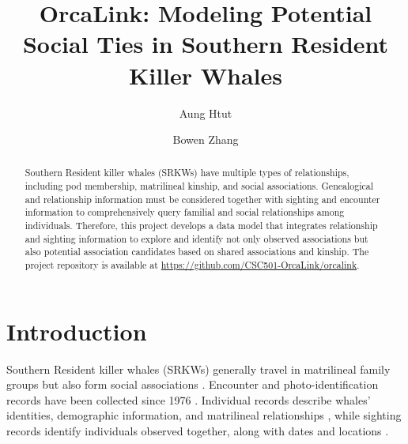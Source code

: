 \documentclass[sigconf]{acmart}
\begin{document}
\pagestyle{empty}
\title{\textbf{OrcaLink: Modeling Potential Social Ties in Southern Resident Killer Whales}}


\author{Aung Htut}
\author{Bowen Zhang}

\begin{abstract}
  Southern Resident killer whales (SRKWs) have multiple types of relationships, including pod membership, matrilineal kinship, and social associations.
Genealogical and relationship information must be considered together with sighting and encounter information to comprehensively query familial and social relationships among individuals.
Therefore, this project develops a data model that integrates relationship and sighting information to explore and identify not only observed associations but also potential association candidates based on shared associations and kinship. The project repository is available at
\url{https://github.com/CSC501-OrcaLink/orcalink}.
\end{abstract}

\maketitle


\section{Introduction}

Southern Resident killer whales (SRKWs) generally travel in matrilineal family groups but also form social associations \cite{ellis2017}. Encounter and photo-identification records have been collected since 1976 \cite{cwrhistory}. Individual records describe whales' identities, demographic information, and matrilineal relationships \cite{orcaConservancy}, while sighting records identify individuals observed together, along with dates and locations \cite{thompson2026dryad}.
\end{document}
